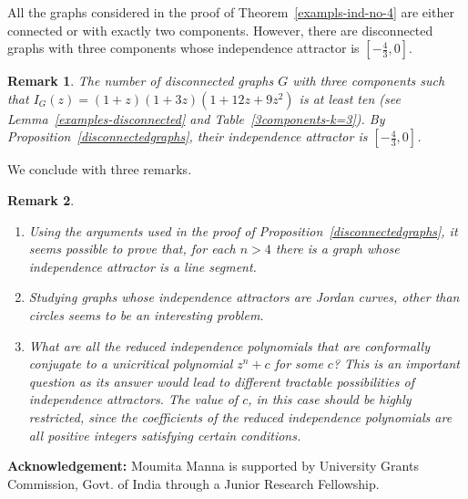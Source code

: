 \documentclass[12pt,a4paper]{article}
\theoremstyle{plain}
\newtheorem{rem}{Remark}[section]
\numberwithin{equation}{section}
\begin{document}
All the graphs considered in the proof of Theorem~\ref{exampls-ind-no-4} are either connected or with exactly two components. However, there are disconnected graphs with three components whose independence attractor is $[-\frac{4}{3},0]$.
    \begin{rem} The number of disconnected graphs \(G\) with three components such that \(I_G(z) = (1+z)(1+3z)(1+12z+9z^2)\) is at least ten (see Lemma~\ref{examples-disconnected} and Table~\ref{3components-k=3}). By Proposition~\ref{disconnectedgraphs}, their independence attractor is $[-\frac{4}{3},0]$.
 
      \end{rem}
      We conclude with three remarks.
      \begin{rem}
      	\begin{enumerate}
      		\item Using the arguments used in the proof of Proposition~\ref{disconnectedgraphs}, it seems possible to prove that, for each $n>4$ there is a graph whose independence attractor is a line segment.  
      		\item Studying graphs whose independence attractors are Jordan curves, other than circles seems to be an interesting problem.
      		\item  What are all the reduced independence polynomials that are conformally conjugate to a unicritical polynomial $z^n + c$ for some $c$? This is an important question as its answer  would lead to different tractable possibilities of independence attractors. The value of $c$, in this case should be highly restricted, since the coefficients of the reduced independence polynomials are all positive integers satisfying certain conditions.
      				\end{enumerate} 
      \end{rem}
 \textbf{Acknowledgement:} Moumita Manna is supported by  University Grants Commission, Govt. of India through a Junior Research Fellowship.
 
\end{document}
